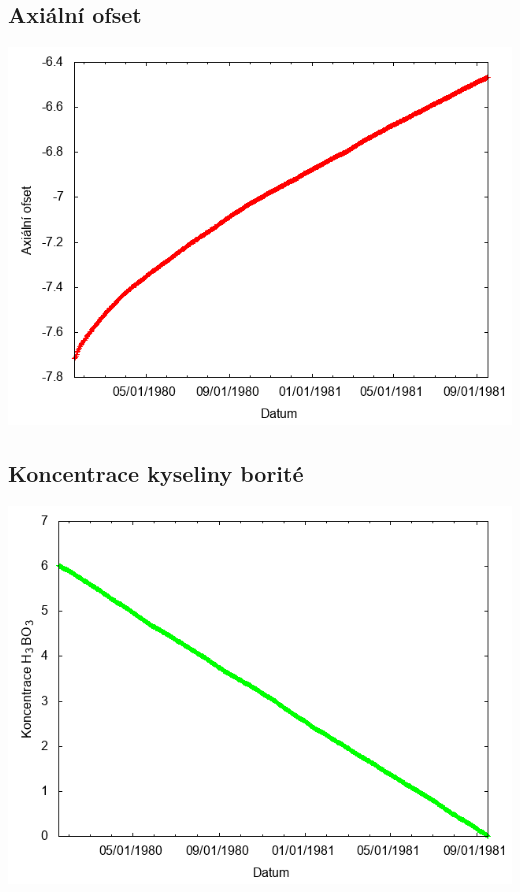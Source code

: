 \documentclass[a4paper,twoside,11pt]{article}
\begin{document}
\subsection*{Axiální ofset}
\begin{center}
\includegraphics[width=.8\textwidth]{graphs/Disneyland_09_ao.png}
\end{center}

\subsection*{Koncentrace kyseliny borité}
\begin{center}
\includegraphics[width=.8\textwidth]{graphs/Disneyland_09_bc.png}
\end{center}
\end{document}
